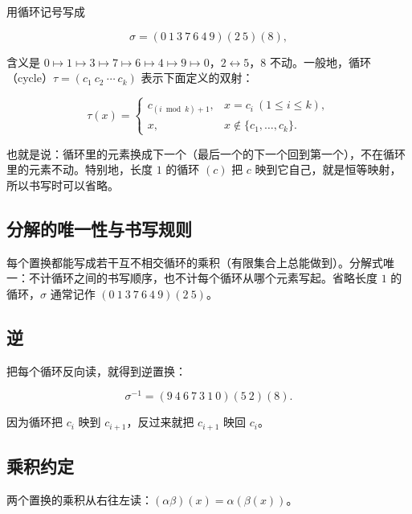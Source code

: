 用循环记号写成

\[\sigma=(0\ 1\ 3\ 7\ 6\ 4\ 9)(2\ 5)(8),\]

含义是 $0\mapsto1\mapsto3\mapsto7\mapsto6\mapsto4\mapsto9\mapsto0$，$2\leftrightarrow5$，$8$ 不动。一般地，循环（cycle）$\tau=(c_1\ c_2\ \cdots\ c_k)$ 表示下面定义的双射：

\[
\tau(x)=
\begin{cases}
c_{(i\bmod k)+1}, & x=c_i\ (1\le i\le k),\\
x, & x\notin\{c_1,\ldots,c_k\}.
\end{cases}
\]

也就是说：循环里的元素换成下一个（最后一个的下一个回到第一个），不在循环里的元素不动。特别地，长度 $1$ 的循环 $(c)$ 把 $c$ 映到它自己，就是恒等映射，所以书写时可以省略。

\subsection{分解的唯一性与书写规则}


每个置换都能写成若干互不相交循环的乘积（有限集合上总能做到）。分解式唯一：不计循环之间的书写顺序，也不计每个循环从哪个元素写起。省略长度 $1$ 的循环，$\sigma$ 通常记作 $(0\ 1\ 3\ 7\ 6\ 4\ 9)(2\ 5)$。

\subsection{逆}


把每个循环反向读，就得到逆置换：

\[\sigma^{-1}=(9\ 4\ 6\ 7\ 3\ 1\ 0)(5\ 2)(8).\]

因为循环把 $c_i$ 映到 $c_{i+1}$，反过来就把 $c_{i+1}$ 映回 $c_i$。

\subsection{乘积约定}


两个置换的乘积从右往左读：$(\alpha\beta)(x)=\alpha(\beta(x))$。
